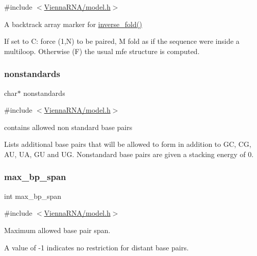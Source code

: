 {\ttfamily \#include $<$\hyperlink{model_8h}{Vienna\+R\+N\+A/model.\+h}$>$}



A backtrack array marker for \hyperlink{group__inverse__fold_ga7af026de55d4babad879f2c92559cbbc}{inverse\+\_\+fold()} 

If set to \textquotesingle{}C\textquotesingle{}\+: force (1,N) to be paired, \textquotesingle{}M\textquotesingle{} fold as if the sequence were inside a multiloop. Otherwise (\textquotesingle{}F\textquotesingle{}) the usual mfe structure is computed. \mbox{\label{group__model__details_ga2695d91cc535d09c2eae5c3884e2ec64}} 
\subsubsection{\texorpdfstring{nonstandards}{nonstandards}}
{\footnotesize\ttfamily char$\ast$ nonstandards}



{\ttfamily \#include $<$\hyperlink{model_8h}{Vienna\+R\+N\+A/model.\+h}$>$}



contains allowed non standard base pairs 

Lists additional base pairs that will be allowed to form in addition to GC, CG, AU, UA, GU and UG. Nonstandard base pairs are given a stacking energy of 0. \mbox{\label{group__model__details_ga18df869af0d70101106458fc3f027806}} 
\subsubsection{\texorpdfstring{max\+\_\+bp\+\_\+span}{max\_bp\_span}}
{\footnotesize\ttfamily int max\+\_\+bp\+\_\+span}



{\ttfamily \#include $<$\hyperlink{model_8h}{Vienna\+R\+N\+A/model.\+h}$>$}



Maximum allowed base pair span. 

A value of -\/1 indicates no restriction for distant base pairs. 